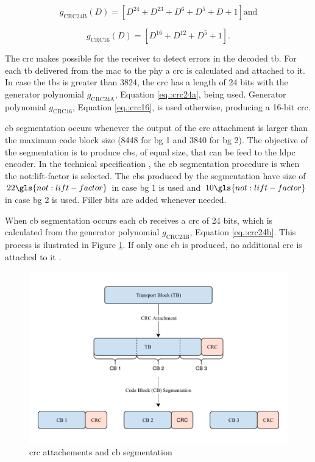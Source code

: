 \begin{equation}\label{eq.:crc24b}
    g_{\mathrm{CRC24B}}(D) = \left[ D^{24} + D^{23} + D^{6} + D^{5} + D + 1 \right] \text{and}
\end{equation}

\begin{equation} \label{eq.:crc16}
    g_{\mathrm{CRC16}}(D) = \left[ D^{16} + D^{12} + D^{5} + 1 \right] \text{.}
\end{equation}


The \gls{crc} makes possible for the receiver to detect errors in the decoded \gls{tb}.
%
For each \gls{tb} delivered from the \gls{mac} to the \gls{phy} a \gls{crc} is calculated and attached to it.
%
In case the \gls{tbs} is greater than 3824, the \gls{crc} has a length of 24 bits with the generator polynomial $g_{\mathrm{CRC24A}}$, Equation \eqref{eq.:crc24a}, being used.
%
Generator polynomial $g_{\mathrm{CRC16}}$, Equation \eqref{eq.:crc16}, is used otherwise, producing a 16-bit \gls{crc}.


\Gls{cb} segmentation occurs whenever the output of the \gls{crc} attachment is larger than the maximum code block size (8448 for \gls{bg} 1 and 3840 for \gls{bg} 2).
%
The objective of the segmentation is to produce \glspl{cb}, of equal size, that can be feed to the \gls{ldpc} encoder.
%
In the technical specification \cite{3gpp.38.212}, the \gls{cb} segmentation procedure is when the \gls{not:lift-factor} is selected.
%
The \glspl{cb} produced by the segmentation have size of $22 \gls{not:lift-factor}$ in case \gls{bg} 1 is used and $10 \gls{not:lift-factor}$ in case \gls{bg} 2 is used.
%
Filler bits are added whenever needed.

When \gls{cb} segmentation occurs each \gls{cb} receives a \gls{crc} of 24 bits, which is calculated from the generator polynomial $g_{\mathrm{CRC24B}}$, Equation \eqref{eq.:crc24b}.
%
This process is ilustrated in Figure \ref{fig:cbcrc}.
%
If only one \gls{cb} is produced, no additional \gls{crc} is attached to it \cite{ErikDahlman5G, 3gpp.38.212}.
%


\begin{figure}[htb]
    \includegraphics[width=\columnwidth]{figures/chp_theory/CRC.pdf}
    \caption{\gls{crc} attachements and \gls{cb} segmentation}
    \label{fig:cbcrc}
\end{figure}

